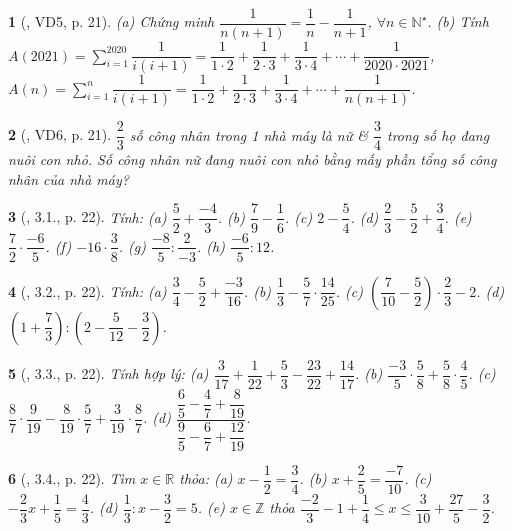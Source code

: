 \documentclass{article}
\newtheorem{baitoan}{}
\begin{document}
\begin{baitoan}[\cite{Binh_boi_duong_Toan_6_tap_2}, VD5, p. 21]
	(a) Chứng minh $\dfrac{1}{n(n + 1)} = \dfrac{1}{n} - \dfrac{1}{n + 1}$, $\forall n\in\mathbb{N}^\star$. (b) Tính $A(2021) = \sum_{i=1}^{2020} \dfrac{1}{i(i + 1)} = \dfrac{1}{1\cdot2} + \dfrac{1}{2\cdot3} + \dfrac{1}{3\cdot4} + \cdots + \dfrac{1}{2020\cdot2021}$, $A(n) = \sum_{i=1}^n \dfrac{1}{i(i + 1)} = \dfrac{1}{1\cdot2} + \dfrac{1}{2\cdot3} + \dfrac{1}{3\cdot4} + \cdots + \dfrac{1}{n(n + 1)}$.
\end{baitoan}

\begin{baitoan}[\cite{Binh_boi_duong_Toan_6_tap_2}, VD6, p. 21]
	$\dfrac{2}{3}$ số công nhân trong 1 nhà máy là nữ \& $\dfrac{3}{4}$ trong số họ đang nuôi con nhỏ. Số công nhân nữ đang nuôi con nhỏ bằng mấy phần tổng số công nhân của nhà máy?
\end{baitoan}

\begin{baitoan}[\cite{Binh_boi_duong_Toan_6_tap_2}, 3.1., p. 22]
	Tính: (a) $\dfrac{5}{2} + \dfrac{-4}{3}$. (b) $\dfrac{7}{9} - \dfrac{1}{6}$. (c) $2 - \dfrac{5}{4}$. (d) $\dfrac{2}{3} - \dfrac{5}{2} + \dfrac{3}{4}$. (e) $\dfrac{7}{2}\cdot\dfrac{-6}{5}$. (f) $-16\cdot\dfrac{3}{8}$. (g) $\dfrac{-8}{5}:\dfrac{2}{-3}$. (h) $\dfrac{-6}{5}:12$.
\end{baitoan}

\begin{baitoan}[\cite{Binh_boi_duong_Toan_6_tap_2}, 3.2., p. 22]
	Tính: (a) $\dfrac{3}{4} - \dfrac{5}{2} + \dfrac{-3}{16}$. (b) $\dfrac{1}{3} - \dfrac{5}{7}\cdot\dfrac{14}{25}$. (c) $\left(\dfrac{7}{10} - \dfrac{5}{2}\right)\cdot\dfrac{2}{3} - 2$. (d) $\left(1 + \dfrac{7}{3}\right):\left(2 - \dfrac{5}{12} - \dfrac{3}{2}\right)$.
\end{baitoan}

\begin{baitoan}[\cite{Binh_boi_duong_Toan_6_tap_2}, 3.3., p. 22]
	Tính hợp lý: (a) $\dfrac{3}{17} + \dfrac{1}{22} + \dfrac{5}{3} - \dfrac{23}{22} + \dfrac{14}{17}$. (b) $\dfrac{-3}{5}\cdot\dfrac{5}{8} + \dfrac{5}{8}\cdot\dfrac{4}{5}$. (c) $\dfrac{8}{7}\cdot\dfrac{9}{19} - \dfrac{8}{19}\cdot\dfrac{5}{7} + \dfrac{3}{19}\cdot\dfrac{8}{7}$. (d) $\dfrac{\dfrac{6}{5} - \dfrac{4}{7} + \dfrac{8}{19}}{\dfrac{9}{5} - \dfrac{6}{7} + \dfrac{12}{19}}$.
\end{baitoan}

\begin{baitoan}[\cite{Binh_boi_duong_Toan_6_tap_2}, 3.4., p. 22]
	Tìm $x\in\mathbb{R}$ thỏa: (a) $x - \dfrac{1}{2} = \dfrac{3}{4}$. (b) $x + \dfrac{2}{5} = \dfrac{-7}{10}$. (c) $-\dfrac{2}{3}x + \dfrac{1}{5} = \dfrac{4}{3}$. (d) $\dfrac{1}{3}:x - \dfrac{3}{2} = 5$. (e) $x\in\mathbb{Z}$ thỏa $\dfrac{-2}{3} - 1 + \dfrac{1}{4}\le x\le\dfrac{3}{10} + \dfrac{27}{5} - \dfrac{3}{2}$.
\end{baitoan}
\end{document}
